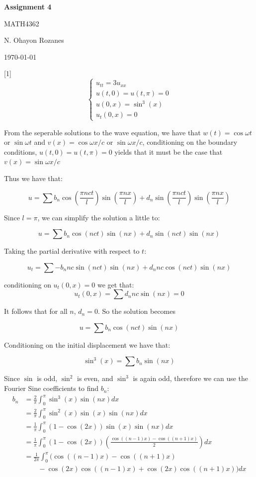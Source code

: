 \documentclass{article}
\newcommand{\question}[2][]{
  \begin{flushleft}
    \textbf{Question #1}: \textit{#2}

\end{flushleft}}
\newcommand{\maketitletwo}[2][]{
  \begin{center}
    \Large{\textbf{Assignment #1}

    MATH4362} %
    \vspace{5pt}

    \normalsize{N. Ohayon Rozanes%

    \today}        %
    \vspace{15pt}

\end{center}}
\begin{document}
\maketitletwo[4]  %

\question[1]{}
$$
\begin{cases}
  u_{tt} = 3u_{xx} \\
  u(t,0) = u(t,\pi) = 0  \\
  u(0,x) = \sin^3(x) \\
  u_t(0,x) = 0
\end{cases}
$$

From the seperable solutions to the wave equation, we have that $w(t)
= \cos \omega t$ or $\sin\omega t$ and $v(x) = \cos \omega x/c$ or
$\sin \omega x/c$, conditioning on the boundary conditions, $u(t,0) =
u(t, \pi) = 0$ yields that it must be the case that $v(x) = \sin \omega x/c$

Thus we have that:

$$
u = \sum b_n \cos \left(\frac{\pi nct}{l}\right)\sin\left(\frac{\pi
nx}{l}\right) + d_n
\sin\left(\frac{\pi nct}{l}\right)\sin\left(\frac{\pi nx}{l}\right)
$$

Since $l = \pi$, we can simplify the solution a little to:

$$
u = \sum b_n \cos \left(nct\right)\sin\left(
nx\right) + d_n
\sin\left(nct\right)\sin\left(nx\right)
$$

Taking the partial derivative with respect to $t$:

\[
  u_t = \sum -b_nnc\sin(nct)\sin(nx) + d_nnc\cos(nct)\sin(nx)
\]

conditioning on $u_t(0, x) = 0$ we get that:
$$
u_t(0,x) = \sum d_nnc\sin(nx) = 0
$$

It follows that for all $n$, $d_n = 0$. So the solution becomes

$$
u = \sum b_n \cos \left(nct\right)\sin\left(nx\right)
$$

Conditioning on the initial displacement we have that:

$$
\sin^3(x) = \sum b_n \sin(nx)
$$

Since $\sin$ is odd, $\sin^2$ is even, and $\sin^3$ is again odd,
therefore we can use the Fourier Sine coefficients to find $b_n$:
\begin{align*}
  b_n &=  \frac{2}{\pi}\int_0^\pi \sin^3(x)\sin(nx) dx \\
  &=  \frac{2}{\pi}\int_0^\pi \sin^2(x)\sin(x)\sin(nx) dx \\
  &=  \frac{1}{\pi}\int_0^\pi (1-\cos(2x))\sin(x)\sin(nx) dx \\
  &=  \frac{1}{\pi}\int_0^\pi (1-\cos(2x))
  \left(\frac{\cos((n-1)x) - \cos((n+1)x)}{2}\right) dx \\
  &= \frac{1}{2\pi}\int_0^\pi \Big(\cos((n-1)x) - \cos((n+1)x) \\
  &\qquad - \cos(2x)\cos((n-1)x) + \cos(2x)\cos((n+1)x)\Big) dx
\end{align*}
\end{document}
